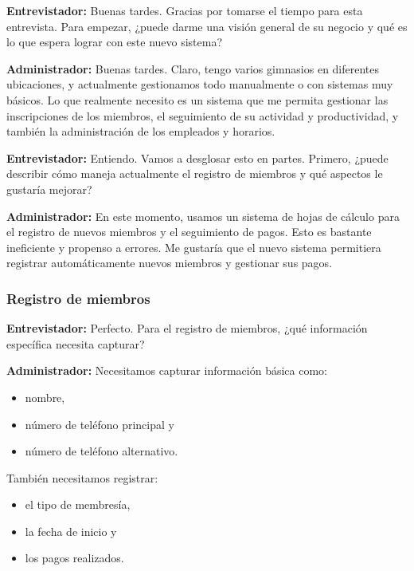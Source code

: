 \documentclass[spanish, 12pt]{article}
\providecommand{\tightlist}{\setlength{\itemsep}{0pt}
\setlength{\parskip}{0pt}}
\begin{document}
	\textbf{Entrevistador:} Buenas tardes. Gracias por tomarse el tiempo para esta
	entrevista. Para empezar, ¿puede darme una visión general de su negocio y qué
	es lo que espera lograr con este nuevo sistema?

	\textbf{Administrador:} Buenas tardes. Claro, tengo varios gimnasios en diferentes
	ubicaciones, y actualmente gestionamos todo manualmente o con sistemas muy
	básicos. Lo que realmente necesito es un sistema que me permita gestionar las inscripciones
	de los miembros, el seguimiento de su actividad y productividad, y también la administración
	de los empleados y horarios.

	\textbf{Entrevistador:} Entiendo. Vamos a desglosar esto en partes. Primero, ¿puede
	describir cómo maneja actualmente el registro de miembros y qué aspectos le gustaría
	mejorar?

	\textbf{Administrador:} En este momento, usamos un sistema de hojas de cálculo
	para el registro de nuevos miembros y el seguimiento de pagos. Esto es
	bastante ineficiente y propenso a errores. Me gustaría que el nuevo sistema permitiera
	registrar automáticamente nuevos miembros y gestionar sus pagos.

	\subsubsection{Registro de miembros}
	\label{registro-de-miembros}

	\textbf{Entrevistador:} Perfecto. Para el registro de miembros, ¿qué información
	específica necesita capturar?

	\textbf{Administrador:} Necesitamos capturar información básica como:

	\begin{itemize}
		\tightlist

		\item nombre,

		\item número de teléfono principal y

		\item número de teléfono alternativo.
	\end{itemize}

	También necesitamos registrar:

	\begin{itemize}
		\tightlist

		\item el tipo de membresía,

		\item la fecha de inicio y

		\item los pagos realizados.
	\end{itemize}
\end{document}
